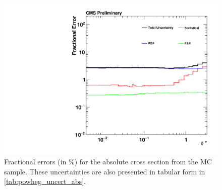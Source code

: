 \begin{figure}[!p]
    \centering
    \includegraphics[width=\textwidth]{figures/powheg_uncertainty_absolute.pdf}
    \caption[
        Fractional errors for the absolute cross section from the
        \POWHEG MC sample.
    ]{
        Fractional errors (in \%) for the absolute cross section from the
        \POWHEG MC sample. These uncertainties are also presented in tabular
        form in \cref{tab:powheg_uncert_abs}.
    }
    \label{fig:powheg_uncert_abs}
\end{figure}
